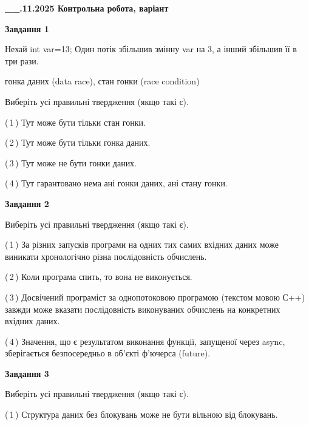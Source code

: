 \documentclass[12pt, ukrainian]{article}
\begin{document}
\begin {large}

\textbf{\_\_.11.2025 Контрольна робота, варіант  }\par


{

\begin{center}
\textbf{Завдання 1}
\end{center}
Нехай int var=13; Один потік збільшив змінну var на 3, а інший збільшив її в три рази.

гонка даних (data race), стан гонки (race condition)

Виберіть усі правильні твердження (якщо такі є).\par
\vspace{2mm}
(\,1\,) Тут може бути тільки стан гонки.%

(\,2\,) Тут може бути тільки гонка даних.%

(\,3\,) Тут може не бути гонки даних.%

(\,4\,) Тут гарантовано нема ані гонки даних, ані стану гонки.%



\begin{center}
\textbf{Завдання 2}
\end{center}
Виберіть усі правильні твердження (якщо такі є).\par
\vspace{2mm}

(\,1\,) За різних запусків програми на одних тих самих вхідних даних може виникати хронологічно різна послідовність обчислень.%

(\,2\,) Коли програма спить, то вона не виконується.%

(\,3\,) Досвічений програміст за однопотоковою програмою (текстом мовою С++) завжди може вказати послідовність виконуваних обчислень на конкретних вхідних даних.%

(\,4\,) Значення, що є результатом виконання функції, запущеної через async, зберігається безпосередньо в об’єкті ф’ючерса (future).%



\begin{center}
\textbf{Завдання 3}
\end{center}
Виберіть усі правильні твердження (якщо такі є).\par
\vspace{2mm}

(\,1\,) Структура даних без блокувань може не бути вільною від блокувань.%

}
\end{large}
\end{document}
